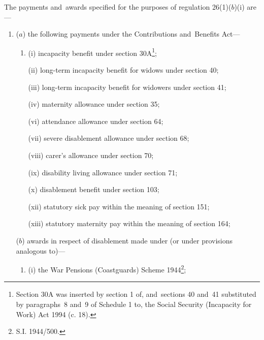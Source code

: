 \documentclass[12pt,a4paper]{article}
\begin{document}
The payments and~awards specified for the purposes of regulation 26(1)($b$)(i) are—
\begin{enumerate}\item[]
($a$) the following payments under the Contributions and~Benefits Act—
\begin{enumerate}\item[]
%
%

(i) incapacity benefit under section 30A\footnote{\frenchspacing Section 30A was inserted by section 1 of, and~sections 40 and~41 substituted by paragraphs~8 and~9 of Schedule 1 to, the Social Security (Incapacity for Work) Act 1994 (c. 18).};

(ii) long-term incapacity benefit for widows under section 40;

(iii) long-term incapacity benefit for widowers under section 41;

(iv) maternity allowance under section 35;


(vi) attendance allowance under section 64;

(vii) severe disablement allowance under section 68;

(viii) 
carer's allowance  %
under section 70;

(ix) disability living allowance under section 71;

(x) disablement benefit under section 103;


(xii) statutory sick pay within the meaning of section 151;

(xiii) statutory maternity pay within the meaning of section 164;
\end{enumerate}

($b$) awards in respect of disablement made under (or under provisions analogous to)—
\begin{enumerate}\item[]
(i) the War Pensions (Coastguards) Scheme 1944\footnote{\frenchspacing S.I. 1944/500.};


\end{enumerate}
\end{enumerate}
\end{document}
